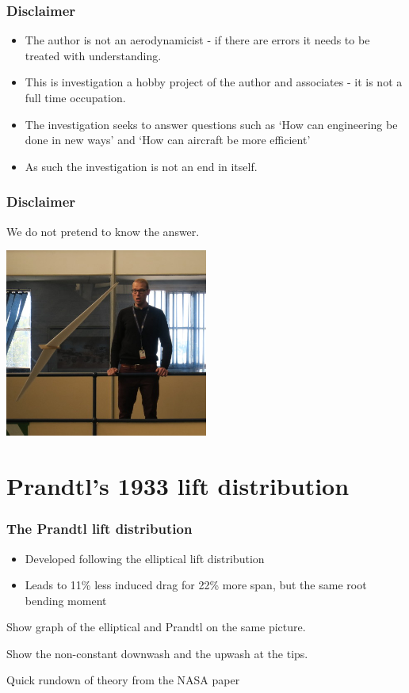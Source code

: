 \documentclass{beamer}
\begin{document}
\begin{frame}
\frametitle{Disclaimer}

\begin{itemize}
\item The author is not an aerodynamicist - if there are errors it needs to be treated with understanding.
\item This is investigation a hobby project of the author and associates - it is not a full time occupation.  
\item The investigation seeks to answer questions such as `How can engineering be done in new ways' and `How can aircraft be more efficient'
\item As such the investigation is not an end in itself.
\end{itemize}

\end{frame}


\begin{frame}
\frametitle{Disclaimer}

We do not pretend to know the answer.

\includegraphics[width = 0.5\textwidth]{Pictures/NoIdea.JPG}

\end{frame}


\section{Prandtl's 1933 lift distribution}

\begin{frame}
\frametitle{The Prandtl lift distribution}
\begin{itemize}
\item Developed following the elliptical lift distribution
\item Leads to 11\% less induced drag for 22\% more span, but the same root bending moment
\end{itemize}


Show graph of the elliptical and Prandtl on the same picture.

Show the non-constant downwash and the upwash at the tips.

Quick rundown of theory from the NASA paper

\end{frame}
\end{document}

